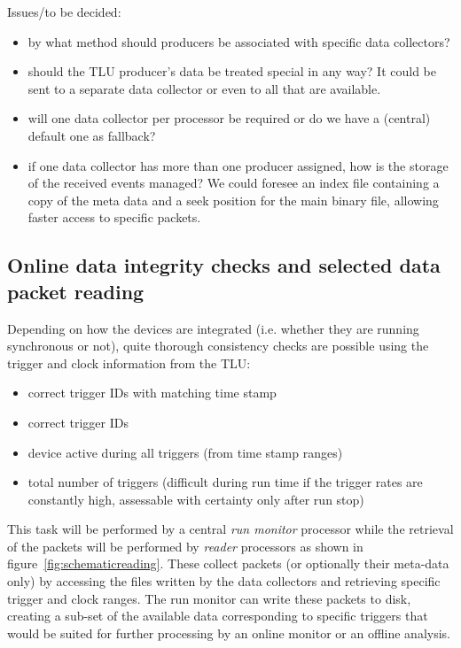 \documentclass[paper=a4, fontsize=11pt]{scrartcl}	%
\numberwithin{equation}{section}		%
\numberwithin{figure}{section}			%
\numberwithin{table}{section}				%
\begin{document}
Issues/to be decided:
\begin{itemize}
\item by what method should producers be associated with specific data collectors?
\item should the TLU producer's data be treated special in any way? It
  could be sent to a separate data collector or even to all that are available.
\item will one data collector per processor be required or do we have
  a (central) default one as fallback?
\item if one data collector has more than one producer assigned, how
  is the storage of the received events managed? We could foresee an
  index file containing a copy of the meta data and a seek position
  for the main binary file, allowing faster access to specific packets.
\end{itemize}


\subsection{Online data integrity checks and selected data packet reading}
\label{sec:integrity}
Depending on how the devices are integrated (i.e. whether they are running
synchronous or not), quite thorough consistency checks are
possible using the trigger and clock information from the TLU:

\begin{itemize}
\item correct trigger IDs with matching time stamp
\item correct trigger IDs
\item device active during all triggers (from time stamp ranges)
\item total number of triggers (difficult during run time if the trigger
  rates are constantly high, assessable with certainty only after run stop)
\end{itemize}

This task will be performed by a central \emph{run monitor} processor
while the retrieval of the packets will be performed by \emph{reader}
processors as shown in figure~\ref{fig:schematicreading}. These
collect packets (or optionally their meta-data only) by accessing the
files written by the data collectors and retrieving specific trigger
and clock ranges. The run monitor can write these packets to disk,
creating a sub-set of the available data corresponding to specific
triggers that would be suited for further processing by an online
monitor or an offline analysis. 
\end{document}
